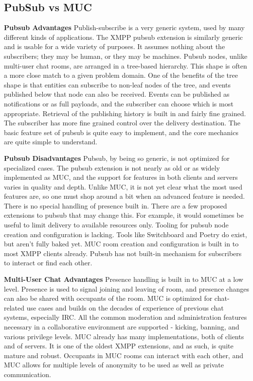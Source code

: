     \subsection{PubSub vs MUC}
	\textbf{Pubsub Advantages}
	\newline
	Publish-subscribe is a very generic system, used by many different kinds of applications. The XMPP pubsub extension is similarly generic and is usable for a wide variety of purposes. It assumes nothing about the subscribers; they may be human, or they may be machines. Pubsub nodes, unlike multi-user chat rooms, are arranged in a tree-based hierarchy. This shape is often a more close match to a given problem domain. One of the benefits of the tree shape is that entities can subscribe to non-leaf nodes of the tree, and events published below that node can also be received. Events can be published as notifications or as full payloads, and the subscriber can choose which is most appropriate. Retrieval of the publishing history is built in and fairly fine grained. The subscriber has more fine grained control over the delivery destination. The basic feature set of pubsub is quite easy to implement, and the core mechanics are quite simple to understand.

	\textbf{Pubsub Disadvantages}
	\newline
	Pubsub, by being so generic, is not optimized for specialized cases. The pubsub extension is not nearly as old or as widely implemented as MUC, and the support for features in both clients and servers varies in quality and depth. Unlike MUC, it is not yet clear what the most used features are, so one must shop around a bit when an advanced feature is needed. There is no special handling of presence built in. There are a few proposed extensions to pubsub that may change this. For example, it would sometimes be useful to limit delivery to available resources only. Tooling for pubsub node creation and configuration is lacking. Tools like Switchboard and Poetry do exist, but aren't fully baked yet. MUC room creation and configuration is built in to most XMPP clients already. Pubsub has not built-in mechanism for subscribers to interact or find each other. 

	\textbf{Multi-User Chat Advantages}
	\newline
	Presence handling is built in to MUC at a low level. Presence is used to signal joining and leaving of room, and presence changes can also be shared with occupants of the room. MUC is optimized for chat-related use cases and builds on the decades of experience of previous chat systems, especially IRC. All the common moderation and administration features necessary in a collaborative environment are supported - kicking, banning, and various privilege levels. MUC already has many implementations, both of clients and of servers. It is one of the oldest XMPP extensions, and as such, is quite mature and robust. Occupants in MUC rooms can interact with each other, and MUC allows for multiple levels of anonymity to be used as well as private communication.

